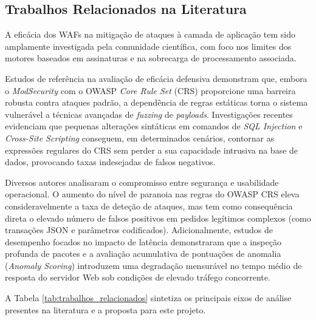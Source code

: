 \documentclass[11pt,a4paper]{article}
\begin{document}
\newpage
\subsection{Trabalhos Relacionados na Literatura}
A eficácia dos WAFs na mitigação de ataques à camada de aplicação tem sido amplamente investigada pela comunidade científica, com foco nos limites dos motores baseados em assinaturas e na sobrecarga de processamento associada.

Estudos de referência na avaliação de eficácia defensiva demonstram que, embora o \textit{ModSecurity} com o OWASP \textit{Core Rule Set} (CRS) proporcione uma barreira robusta contra ataques padrão, a dependência de regras estáticas torna o sistema vulnerável a técnicas avançadas de \textit{fuzzing} de \textit{payloads}. Investigações recentes evidenciam que pequenas alterações sintáticas em comandos de \textit{SQL Injection} e \textit{Cross-Site Scripting} conseguem, em determinados cenários, contornar as expressões regulares do CRS sem perder a sua capacidade intrusiva na base de dados, provocando taxas indesejadas de falsos negativos.

Diversos autores analisaram o compromisso entre segurança e usabilidade operacional. O aumento do nível de paranoia nas regras do OWASP CRS eleva consideravelmente a taxa de deteção de ataques, mas tem como consequência direta o elevado número de falsos positivos em pedidos legítimos complexos (como transações JSON e parâmetros codificados). Adicionalmente, estudos de desempenho focados no impacto de latência demonstraram que a inspeção profunda de pacotes e a avaliação acumulativa de pontuações de anomalia (\textit{Anomaly Scoring}) introduzem uma degradação mensurável no tempo médio de resposta do servidor Web sob condições de elevado tráfego concorrente.

A Tabela \ref{tab:trabalhos_relacionados} sintetiza os principais eixos de análise presentes na literatura e a proposta para este projeto.
\end{document}

